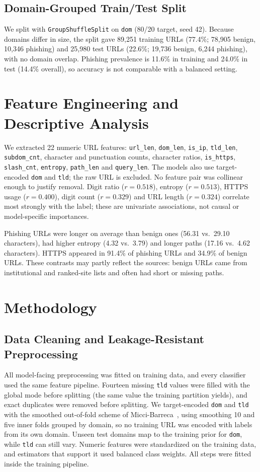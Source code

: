 \documentclass[conference]{IEEEtran}
\begin{document}
\subsection{Domain-Grouped Train/Test Split}
We split with \texttt{GroupShuffleSplit} on \texttt{dom} (80/20 target, seed 42). Because domains differ in size, the split gave 89{,}251 training URLs (77.4\%; 78{,}905 benign, 10{,}346 phishing) and 25{,}980 test URLs (22.6\%; 19{,}736 benign, 6{,}244 phishing), with no domain overlap. Phishing prevalence is 11.6\% in training and 24.0\% in test (14.4\% overall), so accuracy is not comparable with a balanced setting.

\section{Feature Engineering and Descriptive Analysis}
We extracted 22 numeric URL features: \texttt{url\_len}, \texttt{dom\_len}, \texttt{is\_ip}, \texttt{tld\_len}, \texttt{subdom\_cnt}, character and punctuation counts, character ratios, \texttt{is\_https}, \texttt{slash\_cnt}, \texttt{entropy}, \texttt{path\_len} and \texttt{query\_len}. The models also use target-encoded \texttt{dom} and \texttt{tld}; the raw URL is excluded. No feature pair was collinear enough to justify removal. Digit ratio ($r=0.518$), entropy ($r=0.513$), HTTPS usage ($r=0.400$), digit count ($r=0.329$) and URL length ($r=0.324$) correlate most strongly with the label; these are univariate associations, not causal or model-specific importances.

Phishing URLs were longer on average than benign ones (56.31 vs.\ 29.10 characters), had higher entropy (4.32 vs.\ 3.79) and longer paths (17.16 vs.\ 4.62 characters). HTTPS appeared in 91.4\% of phishing URLs and 34.9\% of benign URLs. These contrasts may partly reflect the sources: benign URLs came from institutional and ranked-site lists and often had short or missing paths.

\section{Methodology}
\label{sec:methodology}

\subsection{Data Cleaning and Leakage-Resistant Preprocessing}
All model-facing preprocessing was fitted on training data, and every classifier used the same feature pipeline. Fourteen missing \texttt{tld} values were filled with the global mode before splitting (the same value the training partition yields), and exact duplicates were removed before splitting. We target-encoded \texttt{dom} and \texttt{tld} with the smoothed out-of-fold scheme of Micci-Barreca~\cite{micci2001}, using smoothing 10 and five inner folds grouped by domain, so no training URL was encoded with labels from its own domain. Unseen test domains map to the training prior for \texttt{dom}, while \texttt{tld} can still vary. Numeric features were standardized on the training data, and estimators that support it used balanced class weights. All steps were fitted inside the training pipeline.
\end{document}
